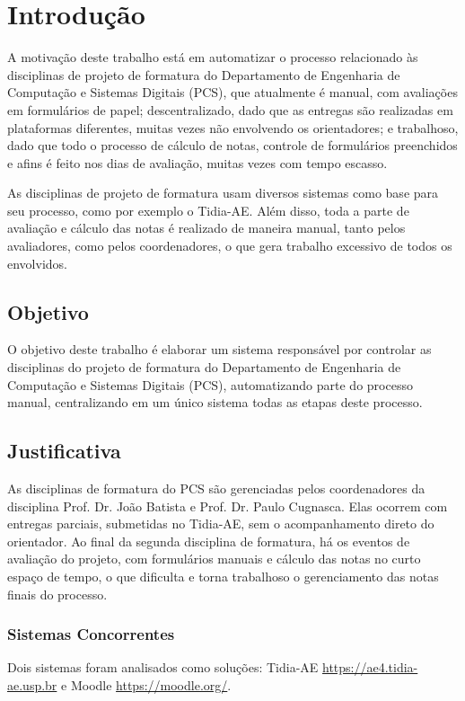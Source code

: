 \chapter{Introdução}\label{chap:introducao}
A motivação deste trabalho está em automatizar o processo relacionado às disciplinas de projeto de formatura do Departamento de Engenharia de Computação e Sistemas Digitais (PCS), que atualmente é manual, com avaliações em formulários de papel; descentralizado, dado que as entregas são realizadas em plataformas diferentes, muitas vezes não envolvendo os orientadores; e trabalhoso, dado que todo o processo de cálculo de notas, controle de formulários preenchidos e afins é feito nos dias de avaliação, muitas vezes com tempo escasso.

As disciplinas de projeto de formatura usam diversos sistemas como base para seu processo, como por exemplo o Tidia-AE. Além disso, toda a parte de avaliação e cálculo das notas é realizado de maneira manual, tanto pelos avaliadores, como pelos coordenadores, o que gera trabalho excessivo de todos os envolvidos.

\section{Objetivo}
O objetivo deste trabalho é elaborar um sistema responsável por controlar as disciplinas do projeto de formatura do Departamento de Engenharia de Computação e Sistemas Digitais (PCS), automatizando parte do processo manual, centralizando em um único sistema todas as etapas deste processo.

\section{Justificativa}
As disciplinas de formatura do PCS são gerenciadas pelos coordenadores da disciplina Prof. Dr. João Batista e Prof. Dr. Paulo Cugnasca. Elas ocorrem com entregas parciais, submetidas no Tidia-AE, sem o acompanhamento direto do orientador. Ao final da segunda disciplina de formatura, há os eventos de avaliação do projeto, com formulários manuais e cálculo das notas no curto espaço de tempo, o que dificulta e torna trabalhoso o gerenciamento das notas finais do processo.

\subsection{Sistemas Concorrentes}
Dois sistemas foram analisados como soluções: Tidia-AE \href{https://ae4.tidia-ae.usp.br}{https://ae4.tidia-ae.usp.br} e Moodle \href{https://moodle.org/}{https://moodle.org/}.

